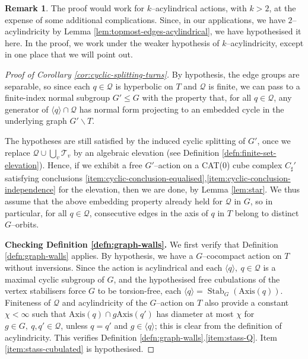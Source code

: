 \documentclass[11pt,oneside]{amsart}
\newcounter{ax}
\theoremstyle{definition}
\newtheorem{rem}[thm]{Remark}
\DeclareMathOperator{\stabilizer}{Stab}
\newcommand{\axis}{\mathrm{Axis}}
\begin{document}
\begin{rem}
The proof would work for $k$--acylindrical actions, with $k>2$, at the expense of some additional complications.  Since, in our applications, we have $2$--acylindricity by Lemma \ref{lem:topmost-edges-acylindrical}, we have hypothesised it here.  In the proof, we work under the weaker hypothesis of $k$--acylindricity, except in one place that we will point out.
\end{rem}

\begin{proof}[Proof of Corollary \ref{cor:cyclic-splitting-turns}]
By hypothesis, the edge groups are separable, so since each $q\in\mathcal Q$ is hyperbolic on $T$ and $\mathcal Q$ is finite, we can pass to a finite-index normal subgroup $G'\leq G$ with the property that, for all $q\in\mathcal Q$, any generator of $\langle q\rangle\cap\mathcal Q$ has normal form projecting to an embedded cycle in the underlying graph $G'\backslash T$.

The hypotheses are still satisfied by the induced cyclic splitting of $G'$, once we replace $\mathcal Q\cup \bigcup_v\mathcal T_v$ by an algebraic elevation (see Definition \ref{defn:finite-set-elevation}).  Hence, if we exhibit a free $G'$--action on a CAT(0) cube complex $C_\sharp'$ satisfying conclusions \eqref{item:cyclic-conclusion-equalised},\eqref{item:cyclic-conclusion-independence} for the elevation, then we are done, by Lemma \ref{lem:star}.  We thus assume that the above embedding property already held for $\mathcal Q$ in $G$, so in particular, for all $q\in\mathcal Q$, consecutive edges in the axis of $q$ in $T$ belong to distinct $G$--orbits.

\textbf{Checking Definition \ref{defn:graph-walls}.}  We first verify that Definition \ref{defn:graph-walls} applies.  By hypothesis, we have a $G$--cocompact action on $T$ without inversions.  Since the action is acylindrical and each $\langle q\rangle,\ q\in\mathcal Q$ is a maximal cyclic subgroup of $G$, and the hypothesised free cubulations of the vertex stabilisers force $G$ to be torsion-free, each $\langle q\rangle=\stabilizer_G(\axis(q))$.  Finiteness of $\mathcal Q$ and acylindricity of the $G$--action on $T$ also provide a constant $\chi<\infty$ such that $\axis(q)\cap g\axis(q')$ has diameter at most $\chi$ for $g\in G,\ q,q'\in\mathcal Q$, unless $q=q'$ and $g\in\langle q\rangle$; this is clear from the definition of acylindricity.  This verifies Definition \ref{defn:graph-walls}.\eqref{item:stass-Q}.  Item \eqref{item:stass-cubulated} is hypothesised.


\end{proof}
\end{document}
